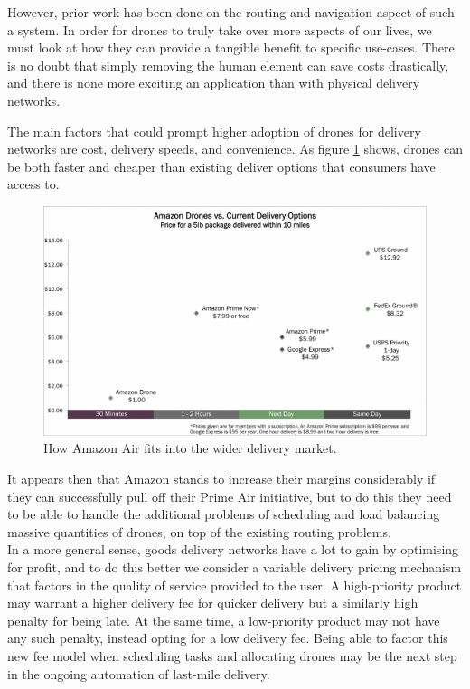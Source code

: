 \documentclass[a4paper,12pt,titlepage]{article}
\begin{document}
However, prior work has been done on the routing and navigation aspect of such a system\cite{Balaji2017}. In order for drones to truly take over more aspects of our lives, we must look at how they can provide a tangible benefit to specific use-cases. There is no doubt that simply removing the human element can save costs drastically, and there is none more exciting an application than with physical delivery networks.

The main factors that could prompt higher adoption of drones for delivery networks are cost, delivery speeds, and convenience. As figure \ref{fig:drone_del_cost} shows, drones can be both faster and cheaper than existing deliver options that consumers have access to.
\begin{figure}[!hbpt]
  \center
  \includegraphics[width=\linewidth]{img/ark-invest-drones-analysis-768x460.png}
  \caption{How Amazon Air fits into the wider delivery market. \cite{Wang}}
  \label{fig:drone_del_cost}
\end{figure}

It appears then that Amazon stands to increase their margins considerably if they can successfully pull off their Prime Air initiative\cite{Welch2015}, but to do this they need to be able to handle the additional problems of scheduling and load balancing massive quantities of drones, on top of the existing routing problems. \\

In a more general sense, goods delivery networks have a lot to gain by optimising for profit, and to do this better we consider a variable delivery pricing mechanism that factors in the quality of service provided to the user. A high-priority product may warrant a higher delivery fee for quicker delivery but a similarly high penalty for being late. At the same time, a low-priority product may not have any such penalty, instead opting for a low delivery fee. Being able to factor this new fee model when scheduling tasks and allocating drones may be the next step in the ongoing automation of last-mile delivery\cite{Joerss2016}.
\end{document}

